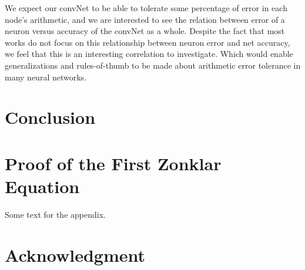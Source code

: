 \documentclass[journal]{IEEEtran}
\begin{document}
	\indent We expect our convNet to be able to tolerate some percentage of error in each node's arithmetic, and we are interested to see the relation between error of a neuron versus accuracy of the convNet as a whole. Despite the fact that most works do not focus on this relationship between neuron error and net accuracy, we feel that this is an interesting correlation to investigate. Which would enable generalizations and rules-of-thumb to be made about arithmetic error tolerance in many neural networks.\\

\section{Conclusion}
\blindtext






%


\appendices
\section{Proof of the First Zonklar Equation}
Some text for the appendix.

\section*{Acknowledgment}
\end{document}
